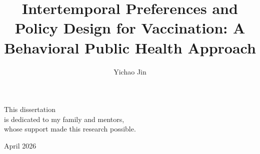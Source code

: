 \documentclass[doublespacing]{utdthesis}
\author{Yichao Jin}
\title{Intertemporal Preferences and Policy Design for Vaccination: A Behavioral Public Health Approach}
\begin{document}
\frontmatter

\signaturepage
{} %

\begin{dedication} %
This dissertation \\
is dedicated to my family and mentors, \\
whose support made this research possible.
\end{dedication}

\maketitle

\begin{acks}{April 2026} %

\end{acks}
\end{document}
